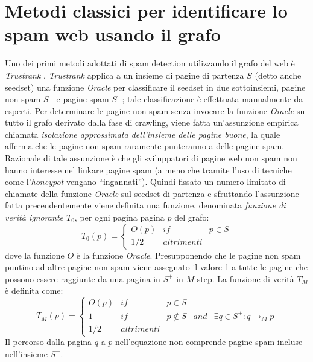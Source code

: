 \section{Metodi classici per identificare lo spam web usando il grafo}
Uno dei primi metodi adottati di spam detection utilizzando il grafo del web è \textit{Trustrank} \cite{Gyongyi:2004:CWS:1316689.1316740}. \textit{Trustrank} applica a un insieme di pagine di partenza \(S\) (detto anche seedset) una funzione \textit{Oracle} per classificare il seedset in due sottoinsiemi, pagine non spam \(S^+\) e pagine spam \(S^-\); tale classificazione è effettuata manualmente da esperti. Per determinare le pagine non spam senza invocare la funzione \textit{Oracle} su tutto il grafo derivato dalla fase di crawling, viene fatta un'assunzione empirica chiamata \textit{isolazione approssimata dell'insieme delle pagine buone}, la quale afferma che le pagine non spam raramente punteranno a delle pagine spam. Razionale di tale assunzione è che gli sviluppatori di pagine web non spam non hanno interesse nel linkare pagine spam (a meno che  tramite l'uso di tecniche come l'\textit{honeypot} vengano ``ingannati''). Quindi fissato un numero limitato di chiamate della funzione \textit{Oracle} sul 
seedset di partenza e sfruttando l'assunzione fatta precendentemente viene definita una funzione, denominata \textit{funzione di verità ignorante \(T_0\)}, per ogni pagina pagina \(p\) del grafo:
\begin{equation}
T_0(p)=\left\{
\begin{array}{ccc}
O(p) & if & p\in S \\
1/2 & altrimenti
\end{array}
\right .
\end{equation}
dove la funzione \(O\) è la funzione \textit{Oracle}. Presupponendo che le pagine non spam puntino ad altre pagine non spam viene assegnato il valore 1 a tutte le pagine che possono essere raggiunte da una pagina in \(S^+\) in \(M\) step. La funzione di verità \(T_M\) è definita come:
\begin{equation}
T_M(p)=\left\{
\begin{array}{ccccc}
O(p) & if & p\in S \\
1 & if & p \not\in S & and & \exists q\in S^+:q\rightarrow_M p \\
1/2 & altrimenti
\end{array}
\right .
\end{equation}
Il percorso  dalla pagina \(q\) a \(p\) nell'equazione non comprende pagine spam incluse nell'insieme \(S^-\).
